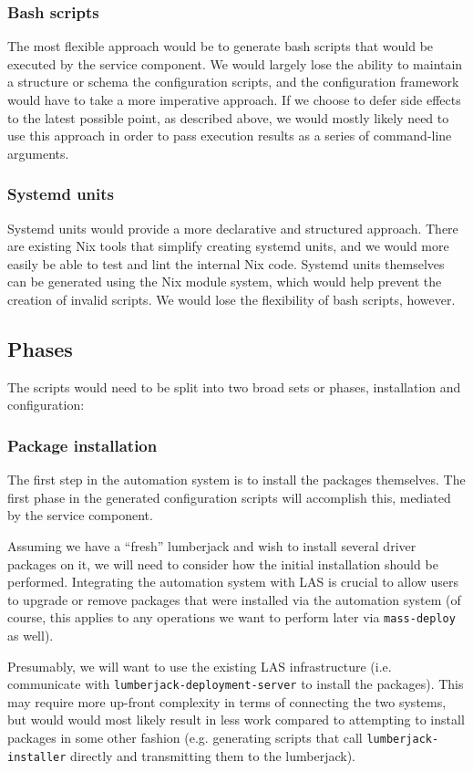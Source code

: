 \documentclass[11pt]{article}
\begin{document}
\subsubsection*{Bash scripts}
\label{sec:orgdeee866}
The most flexible approach would be to generate bash scripts that would be executed by the service component. We would largely lose the ability to maintain a structure or schema the configuration scripts, and the configuration framework would have to take a more imperative approach. If we choose to defer side effects to the latest possible point, as described above, we would mostly likely need to use this approach in order to pass execution results as a series of command-line arguments.
\subsubsection*{Systemd units}
\label{sec:org0cb0f46}
Systemd units would provide a more declarative and structured approach. There are existing Nix tools that simplify creating systemd units, and we would more easily be able to test and lint the internal Nix code. Systemd units themselves can be generated using the Nix module system, which would help prevent the creation of invalid scripts. We would lose the flexibility of bash scripts, however.
\subsection*{Phases}
\label{sec:orgf7b940e}
The scripts would need to be split into two broad sets or phases, installation and configuration:
\subsubsection*{Package installation}
\label{sec:org898615b}
The first step in the automation system is to install the packages themselves. The first phase in the generated configuration scripts will accomplish this, mediated by the service component.

Assuming we have a ``fresh'' lumberjack and wish to install several driver packages on it, we will need to consider how the initial installation should be performed. Integrating the automation system with LAS is crucial to allow users to upgrade or remove packages that were installed via the automation system (of course, this applies to any operations we want to perform later via \texttt{mass-deploy} as well).

Presumably, we will want to use the existing LAS infrastructure (i.e. communicate with \texttt{lumberjack-deployment-server} to install the packages). This may require more up-front complexity in terms of connecting the two systems, but would would most likely result in less work compared to attempting to install packages in some other fashion (e.g. generating scripts that call \texttt{lumberjack-installer} directly and transmitting them to the lumberjack).
\end{document}
